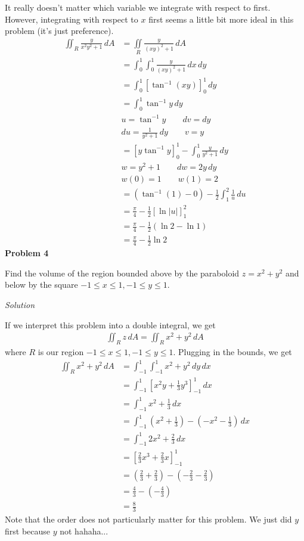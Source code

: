 \documentclass{article}
\newcommand{\lrp}[1]{\left( #1 \right)}
\newcommand{\lrb}[1]{\left[ #1 \right]}
\newcommand{\iintR}[0]{\iint\limits_{R}}
\newcommand{\Solution}{\textit{Solution}}
\begin{document}
It really doesn't matter which variable we integrate with respect to first. However, integrating with respect to $x$ first seems a little bit more ideal in this problem (it's just preference).
\begin{align*}
    \iint_R \frac{y}{x^2y^2+1}\,dA&=\iintR \frac{y}{(xy)^2+1}\,dA\\
    &=\int_0^1\int_0^1\frac{y}{(xy)^2+1}\,dx\,dy\\
    &=\int_0^1\lrb{\tan^{-1}(xy)}_0^1\,dy\\
    &=\int_0^1\tan^{-1} y\,dy\\
    &u=\tan^{-1}y \hspace{2em}dv=dy\\
    &du=\frac{1}{y^2+1}\,dy\hspace{2em}v=y\\
    &=\lrb{y\tan^{-1}y}_0^1-\int_0^1\frac{y}{y^2+1}\,dy\\
    &w=y^2+1\hspace{2em}dw=2y\,dy\\
    &w(0)=1\hspace{2em}w(1)=2\\
    &=\lrp{\tan^{-1}(1)-0}-\frac{1}{2}\int_1^2\frac{1}{u}\,du\\
    &=\frac{\pi}{4}-\frac{1}{2}\lrb{\ln|u|}_1^2\\
    &=\frac{\pi}{4}-\frac{1}{2}\lrp{\ln 2-\ln 1}\\
    &=\boxed{\frac{\pi}{4}-\frac{1}{2}\ln 2}
\end{align*}
\newpage
\textbf{Problem 4}

Find the volume of the region bounded above by the paraboloid $z=x^2+y^2$ and below by the square $-1\leq x \leq 1, -1\leq y\leq 1$.

\Solution

If we interpret this problem into a double integral, we get
\begin{align*}
    \iint_R z\,dA=\iint_R x^2+y^2\,dA
\end{align*}
where $R$ is our region $-1\leq x \leq 1, -1\leq y\leq 1$. Plugging in the bounds, we get
\begin{align*}
    \iint_R x^2+y^2\,dA&=\int_{-1}^1\int_{-1}^1 x^2+y^2\,dy\,dx\\
    &=\int_{-1}^1\lrb{x^2y+\frac{1}{3}y^3}_{-1}^1\,dx\\
    &=\int_{-1}^1 x^2+\frac{1}{3}\,dx\\
    &=\int_{-1}^1 \lrp{x^2+\frac{1}{3}}-\lrp{-x^2-\frac{1}{3}}\,dx\\
    &=\int_{-1}^1 2x^2 +\frac{2}{3}\,dx\\
    &=\lrb{\frac{2}{3}x^3+\frac{2}{3}x}_{-1}^1\\
    &=\lrp{\frac{2}{3}+\frac{2}{3}}-\lrp{-\frac{2}{3}-\frac{2}{3}}\\
    &=\frac{4}{3}-\lrp{-\frac{4}{3}}\\
    &=\boxed{\frac{8}{3}}
\end{align*}
Note that the order does not particularly matter for this problem. We just did $y$ first because $y$ not hahaha...
\end{document}
